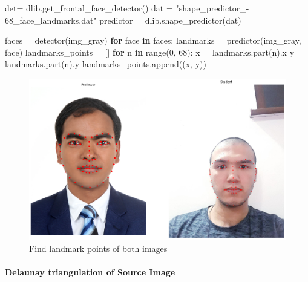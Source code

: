 \documentclass[12pt, a4paper, twocolumn]{article}
\newenvironment{Shaded}{}{}
\newcommand{\KeywordTok}[1]{\textcolor[rgb]{0.00,0.44,0.13}{\textbf{#1}}}
\newcommand{\DecValTok}[1]{\textcolor[rgb]{0.25,0.63,0.44}{#1}}
\newcommand{\StringTok}[1]{\textcolor[rgb]{0.25,0.44,0.63}{#1}}
\newcommand{\ControlFlowTok}[1]{\textcolor[rgb]{0.00,0.44,0.13}{\textbf{#1}}}
\newcommand{\OperatorTok}[1]{\textcolor[rgb]{0.40,0.40,0.40}{#1}}
\newcommand{\BuiltInTok}[1]{#1}
\newcommand{\NormalTok}[1]{#1}
\let\oldparagraph\paragraph
\renewcommand{\paragraph}[1]{\oldparagraph{#1}\mbox{}}
\begin{document}
\begin{Shaded}
\small
\begin{Highlighting}[]
\NormalTok{det}\OperatorTok{=}\NormalTok{ dlib.get_frontal_face_detector()}
\NormalTok{dat }\OperatorTok{=} \StringTok{"}\NormalTok{shape_predictor_-}\OperatorTok{}
\NormalTok{68_face_landmarks.dat}\StringTok{"}
\NormalTok{predictor }\OperatorTok{=}\NormalTok{ dlib.shape_predictor(dat)}

\NormalTok{faces }\OperatorTok{=}\NormalTok{ detector(img_gray)}
\ControlFlowTok{for}\NormalTok{ face }\KeywordTok{in}\NormalTok{ faces:}
\NormalTok{    landmarks }\OperatorTok{=}\NormalTok{ predictor(img_gray, face)}
\NormalTok{    landmarks_points }\OperatorTok{=}\NormalTok{ []}
\ControlFlowTok{for}\NormalTok{ n }\KeywordTok{in} \BuiltInTok{range}\NormalTok{(}\DecValTok{0}\NormalTok{, }\DecValTok{68}\NormalTok{):}
\NormalTok{        x }\OperatorTok{=}\NormalTok{ landmarks.part(n).x}
\NormalTok{        y }\OperatorTok{=}\NormalTok{ landmarks.part(n).y}
\NormalTok{        landmarks_points.append((x, y))}
\end{Highlighting}
\end{Shaded}

\begin{figure}
	\centering
	\includegraphics{meta/output_31_0.png}
	\caption{Find landmark points of both images}
\end{figure}

\paragraph{Delaunay triangulation of Source Image}\label{header-n153}
\end{document}
